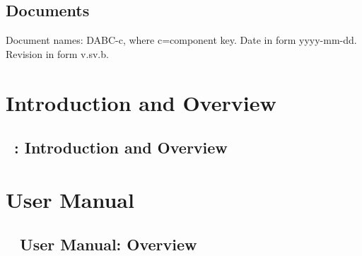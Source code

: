 \documentclass{dabcclass}
\begin{document}
 \cleardoublepage
\thispagestyle{empty} \tableofcontents \thispagestyle{empty} \cleardoublepage
{}

 \cleardoublepage
 \cleardoublepage
 \cleardoublepage
 \cleardoublepage
 \cleardoublepage

\setcounter{chapter}{0}
\chapter{Documents}
Document names: DABC-c, where c=component key. Date in form yyyy-mm-dd.
Revision in form v.sv.b.\\

%



%
%

%
%
\cleardoublepage
\part{Introduction and Overview}
\chapter{\dabc~: Introduction and Overview}
 \cleardoublepage
\part{User Manual}
\chapter{\dabc~ User Manual: Overview}
 \cleardoublepage
\end{document}
